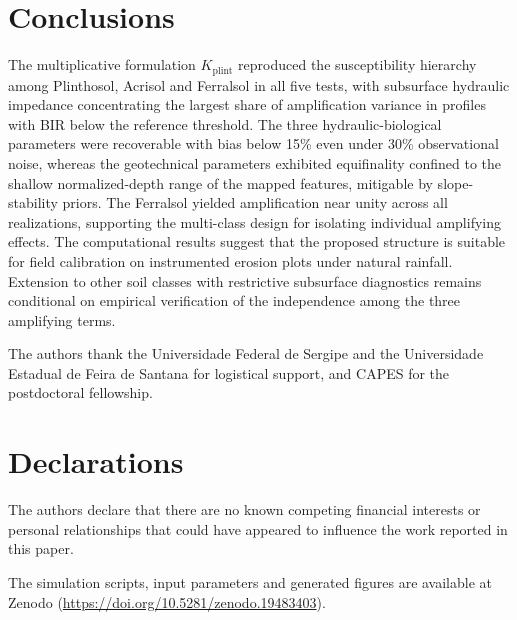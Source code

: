 \documentclass[pdflatex,sn-basic,referee,lineno]{sn-jnl}
\begin{document}
\section{Conclusions}
\label{sec:conclusions}

The multiplicative formulation $K_{\mathrm{plint}}$ reproduced the susceptibility hierarchy among Plinthosol, Acrisol and Ferralsol in all five tests, with subsurface hydraulic impedance concentrating the largest share of amplification variance in profiles with BIR below the reference threshold. The three hydraulic-biological parameters were recoverable with bias below 15\% even under 30\% observational noise, whereas the geotechnical parameters exhibited equifinality confined to the shallow normalized-depth range of the mapped features, mitigable by slope-stability priors. The Ferralsol yielded amplification near unity across all realizations, supporting the multi-class design for isolating individual amplifying effects. The computational results suggest that the proposed structure is suitable for field calibration on instrumented erosion plots under natural rainfall. Extension to other soil classes with restrictive subsurface diagnostics remains conditional on empirical verification of the independence among the three amplifying terms.

\backmatter

The authors thank the Universidade Federal de Sergipe and the Universidade Estadual de Feira de Santana for logistical support, and CAPES for the postdoctoral fellowship.

\section*{Declarations}

 The authors declare that there are no known competing financial interests or personal relationships that could have appeared to influence the work reported in this paper.

 The simulation scripts, input parameters and generated figures are available at Zenodo (\url{https://doi.org/10.5281/zenodo.19483403}).
\end{document}
